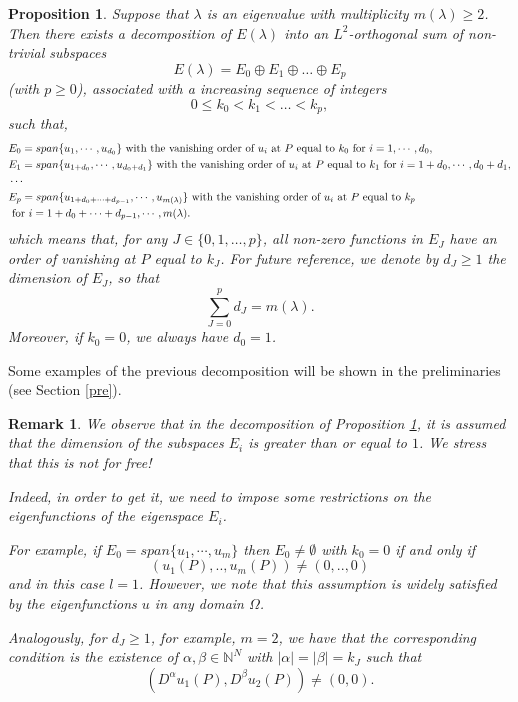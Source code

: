 \documentclass[11pt,reqno]{article}
\newtheorem{prop}[teo]{Proposition}
\newtheorem{rem}[teo]{Remark}
\numberwithin{equation}{section}
\newcommand\la\lambda
\renewcommand\O\Omega
\begin{document}
\begin{prop}\label{dec} \cite[Proposition 1.10]{alm1}
 Suppose that $\la$ is an eigenvalue with multiplicity $m(\la)\ge2$. Then there exists a decomposition of $E(\lambda)$ into an $L^2$-orthogonal sum of non-trivial subspaces
\[E(\lambda)=E_0\oplus E_1\oplus \dots \oplus E_p\]
(with $p\ge 0$), associated with a increasing sequence of integers 
\[0\leq k_0<k_1<\dots<k_p,\]
such that,
\begin{equation}\label{intr-eqdefE}
			\begin{split}
				&E_0=span\{u_1,\cdots,u_{d_0}\}
                \hbox{ with the vanishing order of } u_i \hbox{ at } P \hbox{ equal to } k_0 \hbox{ for }i=1,\cdots,d_0,\\
                &E_1=span\{u_{1+d_0},\cdots,u_{d_0+d_1}\}
                \hbox{ with the vanishing order of } u_i \hbox{ at } P \hbox{ equal to } k_1 \hbox{ for }i=1+d_0,\cdots,d_0+d_1,\\
				&\cdots\\
                &E_p=span\{u_{1+d_0+\cdots+d_{p-1}},\cdots,u_{m(\la)}\} \hbox{ with the vanishing order of } u_i \hbox{ at } P \hbox{ equal to } k_p \\&\hbox{ for }i=1+d_0+\cdots+d_{p-1},\cdots,m(\lambda).
			\end{split}
		\end{equation}
 which means that, for any $J\in \{0,1,\dots,p\} $, all non-zero functions in $E_J$ have an order of vanishing at $P$ equal to $k_J$. For future reference, we denote by $d_J\ge1$ the dimension of $E_J$, so that 
\[   \sum_{J=0}^p d_J=m(\lambda). 
\]
Moreover, if $k_0=0$, we always have $d_0=1$.
\end{prop}
Some examples of the previous decomposition will be shown in the preliminaries (see Section \ref{pre}).
\begin{rem}\label{ir}
We observe that in the decomposition of Proposition \ref{dec}, it is assumed that the dimension of the subspaces $E_i$ is greater than or equal to $1$. We stress that this is not for free!

Indeed, in order to get it, we need to impose some restrictions on the eigenfunctions of the eigenspace $E_i$.

For example, if $E_0=span\{u_1,\cdots,u_m\}$  then $E_0\ne\emptyset$ with $k_0=0$ if and only if
\begin{equation}\label{i19}
(u_1(P),..,u_m(P))\neq(0,..,0)
\end{equation}
and in this case $l=1$.
However, we note that this assumption is widely satisfied by the eigenfunctions $u$ in any domain $\O$.

Analogously, for $d_J\ge 1$, for example, $m=2$,
we have that the corresponding condition is the existence of $\alpha,\beta\in\mathbb{N}^N$ with $|\alpha|=|\beta|=k_J$ such that 
\begin{equation}\label{ii2}
(D^\alpha u_1(P),D^\beta u_2(P))\neq (0,0) .
\end{equation}
\end{rem}
\end{document}
